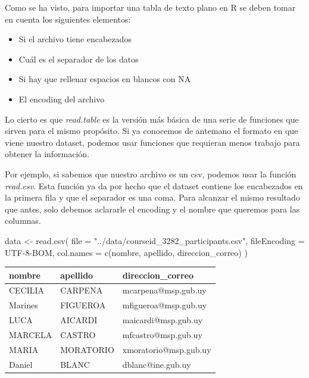 \documentclass[
  letterpaper,
  DIV=11,
  numbers=noendperiod]{scrreprt}
\newenvironment{Shaded}{\begin{snugshade}}{\end{snugshade}}
\newcommand{\AttributeTok}[1]{\textcolor[rgb]{0.40,0.45,0.13}{#1}}
\newcommand{\FunctionTok}[1]{\textcolor[rgb]{0.28,0.35,0.67}{#1}}
\newcommand{\NormalTok}[1]{\textcolor[rgb]{0.00,0.23,0.31}{#1}}
\newcommand{\OtherTok}[1]{\textcolor[rgb]{0.00,0.23,0.31}{#1}}
\newcommand{\StringTok}[1]{\textcolor[rgb]{0.13,0.47,0.30}{#1}}
\begin{document}
Como se ha visto, para importar una tabla de texto plano en R se deben
tomar en cuenta los siguientes elementos:

\begin{itemize}
\item
  Si el archivo tiene encabezados
\item
  Cuál es el separador de los datos
\item
  Si hay que rellenar espacios en blancos con NA
\item
  El encoding del archivo
\end{itemize}

Lo cierto es que \emph{read.table} es la versión más básica de una serie
de funciones que sirven para el mismo propósito. Si ya conocemos de
antemano el formato en que viene nuestro dataset, podemos usar funciones
que requieran menos trabajo para obtener la información.

Por ejemplo, si sabemos que nuestro archivo es un csv, podemos usar la
función \emph{read.csv}. Esta función ya da por hecho que el dataset
contiene los encabezados en la primera fila y que el separador es una
coma. Para alcanzar el mismo resultado que antes, solo debemos aclararle
el encoding y el nombre que queremos para las columnas.

\begin{Shaded}
\begin{Highlighting}[]
\NormalTok{data }\OtherTok{\textless{}{-}} \FunctionTok{read.csv}\NormalTok{(}
  \AttributeTok{file =} \StringTok{"../data/courseid\_3282\_participants.csv"}\NormalTok{,}
  \AttributeTok{fileEncoding =} \StringTok{\textquotesingle{}UTF{-}8{-}BOM\textquotesingle{}}\NormalTok{,}
  \AttributeTok{col.names =} \FunctionTok{c}\NormalTok{(}\StringTok{\textquotesingle{}nombre\textquotesingle{}}\NormalTok{, }\StringTok{\textquotesingle{}apellido\textquotesingle{}}\NormalTok{, }\StringTok{\textquotesingle{}direccion\_correo\textquotesingle{}}\NormalTok{)}
\NormalTok{)}
\end{Highlighting}
\end{Shaded}

\begin{longtable}[]{@{}lll@{}}
\toprule()
nombre & apellido & direccion\_correo \\
\midrule()
\endhead
CECILIA & CARPENA & mcarpena@msp.gub.uy \\
Marines & FIGUEROA & mfigueroa@msp.gub.uy \\
LUCA & AICARDI & maicardi@msp.gub.uy \\
MARCELA & CASTRO & mfcastro@msp.gub.uy \\
MARIA & MORATORIO & xmoratorio@msp.gub.uy \\
Daniel & BLANC & dblanc@ine.gub.uy \\
\bottomrule()
\end{longtable}
\end{document}
